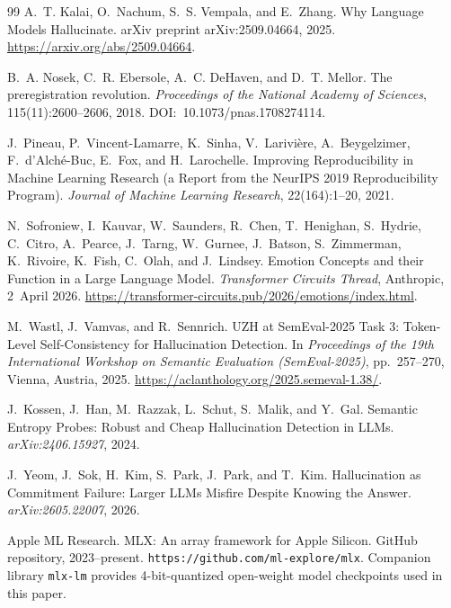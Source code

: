 \documentclass[10pt, letterpaper]{article}
\begin{document}
\begin{thebibliography}{99}
A.~T. Kalai, O.~Nachum, S.~S. Vempala, and E.~Zhang.
\newblock Why Language Models Hallucinate.
\newblock arXiv preprint arXiv:2509.04664, 2025.
\newblock \url{https://arxiv.org/abs/2509.04664}.




B.~A. Nosek, C.~R. Ebersole, A.~C. DeHaven, and D.~T. Mellor.
\newblock The preregistration revolution.
\newblock \emph{Proceedings of the National Academy of Sciences},
115(11):2600--2606, 2018.
\newblock \mbox{DOI: 10.1073/pnas.1708274114}.

J.~Pineau, P.~Vincent-Lamarre, K.~Sinha, V.~Larivi\`ere,
A.~Beygelzimer, F.~d'Alch\'e-Buc, E.~Fox, and H.~Larochelle.
\newblock Improving Reproducibility in Machine Learning Research (a
Report from the NeurIPS 2019 Reproducibility Program).
\newblock \emph{Journal of Machine Learning Research},
22(164):1--20, 2021.

N.~Sofroniew, I.~Kauvar, W.~Saunders, R.~Chen, T.~Henighan, S.~Hydrie,
C.~Citro, A.~Pearce, J.~Tarng, W.~Gurnee, J.~Batson, S.~Zimmerman,
K.~Rivoire, K.~Fish, C.~Olah, and J.~Lindsey.
\newblock Emotion Concepts and their Function in a Large Language
Model.
\newblock \emph{Transformer Circuits Thread}, Anthropic, 2~April 2026.
\newblock \url{https://transformer-circuits.pub/2026/emotions/index.html}.

M.~Wastl, J.~Vamvas, and R.~Sennrich.
\newblock UZH at SemEval-2025 Task 3: Token-Level Self-Consistency
for Hallucination Detection.
\newblock In \emph{Proceedings of the 19th International Workshop on
Semantic Evaluation (SemEval-2025)}, pp.~257--270, Vienna, Austria,
2025.
\newblock \url{https://aclanthology.org/2025.semeval-1.38/}.

J.~Kossen, J.~Han, M.~Razzak, L.~Schut, S.~Malik, and Y.~Gal.
\newblock Semantic Entropy Probes: Robust and Cheap Hallucination
Detection in LLMs.
\newblock \emph{arXiv:2406.15927}, 2024.

J.~Yeom, J.~Sok, H.~Kim, S.~Park, J.~Park, and T.~Kim.
\newblock Hallucination as Commitment Failure: Larger LLMs Misfire
Despite Knowing the Answer.
\newblock \emph{arXiv:2605.22007}, 2026.

Apple ML Research.
\newblock MLX: An array framework for Apple Silicon.
\newblock GitHub repository, 2023--present.
\newblock \texttt{https://github.com/ml-explore/mlx}. Companion library
\texttt{mlx-lm} provides 4-bit-quantized open-weight model checkpoints
used in this paper.

\end{thebibliography}
\end{document}
